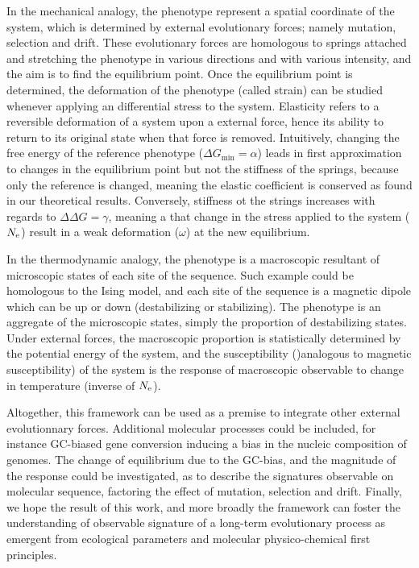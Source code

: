 \documentclass{article}
\begin{document}
	In the mechanical analogy, the phenotype represent a spatial coordinate of the system, which is determined by external evolutionary forces; namely mutation, selection and drift.
	These evolutionary forces are homologous to springs attached and stretching the phenotype in various directions and with various intensity, and the aim is to find the equilibrium point.
	Once the equilibrium point is determined, the deformation of the phenotype (called strain) can be studied whenever applying an differential stress to the system.
	Elasticity refers to a reversible deformation of a system upon a external force, hence its ability to return to its original state when that force is removed.
	Intuitively, changing the free energy of the reference phenotype ($\Delta G_{\text{min}} = \alpha$) leads in first approximation to changes in the equilibrium point but not the stiffness of the springs, because only the reference is changed, meaning the elastic coefficient is conserved as found in our theoretical results.
	Conversely, stiffness ot the strings increases with regards to $\Delta \Delta G = \gamma$, meaning a that change in the stress applied to the system ($N_{\mathrm{e}}$) result in a weak deformation ($\omega$) at the new equilibrium.
	
	In the thermodynamic analogy, the phenotype is a macroscopic resultant of microscopic states of each site of the sequence.
	Such example could be homologous to the Ising model, and each site of the sequence is a magnetic dipole which can be up or down (destabilizing or stabilizing).
	The phenotype is an aggregate of the microscopic states, simply the proportion of destabilizing states.
	Under external forces, the macroscopic proportion is statistically determined by the potential energy of the system, and the susceptibility ()analogous to magnetic susceptibility) of the system is the response of macroscopic observable to change in temperature (inverse of $N_{\mathrm{e}}$).
	
	Altogether, this framework can be used as a premise %
	to integrate other external evolutionnary forces.
	Additional molecular processes could be included, for instance GC-biased gene conversion inducing a bias in the nucleic composition of genomes. 
	The change of equilibrium due to the GC-bias, and the magnitude of the response could be investigated, as to describe the signatures observable on molecular sequence, factoring the effect of mutation, selection and drift.
	Finally, we hope the result of this work, and more broadly the framework can foster the understanding of observable signature of a long-term evolutionary process as emergent from ecological parameters and molecular physico-chemical first principles.
\end{document}
